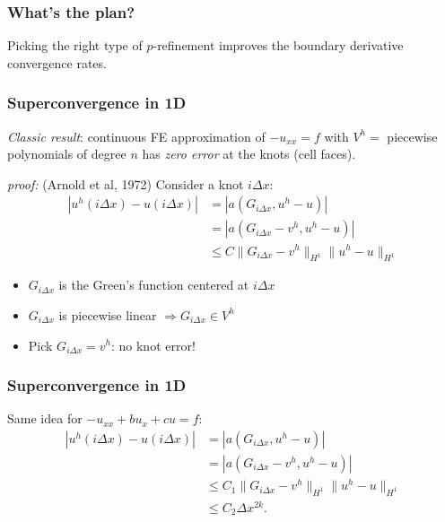 \documentclass[8pt]{beamer}
\begin{document}
\begin{frame}
    \frametitle{What's the plan?}
    \begin{center}
        Picking the right type of \(p\)-refinement improves the boundary
        derivative convergence rates.
    \end{center}
\end{frame}

\begin{frame}
    \frametitle{Superconvergence in 1D}
    \emph{Classic result}: continuous FE approximation of \(-u_{xx} = f\) with
    \(V^h =\) piecewise polynomials of degree \(n\) has \emph{zero error} at the
    knots (cell faces).                                                       \\

    \pause

    \emph{proof:} (Arnold et al, 1972) Consider a knot \(i \Delta x\):
    \begin{align*}
        |u^h(i \Delta x) - u(i \Delta x)|
        &= |a(G_{i\Delta x}, u^h - u)|                                        \\
        &= |a(G_{i\Delta x} - v^h, u^h - u)|                                  \\
        &\leq C \|G_{i\Delta x} - v^h\|_{H^1} \|u^h - u\|_{H^1}
    \end{align*}
    \pause
    \begin{itemize}
        \item \(G_{i\Delta x}\) is the Green's function centered at \(i \Delta
              x\)
        \item \(G_{i \Delta x}\) is piecewise linear
              \(\Rightarrow G_{i\Delta x} \in V^h\)
        \item Pick \(G_{i\Delta x} = v^h\): no knot error!
    \end{itemize}
\end{frame}

\begin{frame}
    \frametitle{Superconvergence in 1D}
    Same idea for \(-u_{xx} + b u_x + c u = f\):
    \pause
    \begin{align*}
        |u^h(i \Delta x) - u(i \Delta x)|
        &= |a(G_{i\Delta x}, u^h - u)|                                        \\
        &= |a(G_{i\Delta x} - v^h, u^h - u)|                                  \\
        &\leq C_1 \|G_{i\Delta x} - v^h\|_{H^1} \|u^h - u\|_{H^1}             \\
        &\leq C_2 \Delta x^{2 k}.
    \end{align*}
\end{frame}
\end{document}
